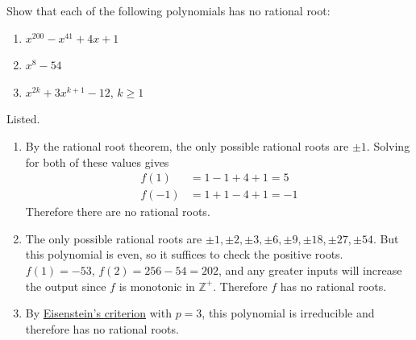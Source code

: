   \begin{exercise}[Shifrin 3.3.4]
    Show that each of the following polynomials has no rational root:
    \begin{enumerate}
      \item $x^{200} - x^{41} + 4x + 1$
      \item $x^8 - 54$
      \item $x^{2k} + 3x^{k+1} - 12$, $k \geq 1$
    \end{enumerate}
  \end{exercise}
  \begin{solution}
    Listed. 
    \begin{enumerate}
      \item By the rational root theorem, the only possible rational roots are $\pm1$. Solving for both of these values gives 
      \begin{align}
        f(1) & = 1 - 1 + 4 + 1 = 5 \\ 
        f(-1)& = 1 + 1 - 4 + 1 = -1
      \end{align}
      Therefore there are no rational roots. 

      \item The only possible rational roots are $\pm 1, \pm 2, \pm 3, \pm 6, \pm 9, \pm 18, \pm 27, \pm 54$. But this polynomial is even, so it suffices to check the positive roots. $f(1) = -53$, $f(2) = 256 - 54 = 202$, and any greater inputs will increase the output since $f$ is monotonic in $\mathbb{Z}^+$. Therefore $f$ has no rational roots. 

      \item By \hyperref[thm:eisensteins-criterion]{Eisenstein's criterion} with $p = 3$, this polynomial is irreducible and therefore has no rational roots. 
    \end{enumerate}
  \end{solution}

